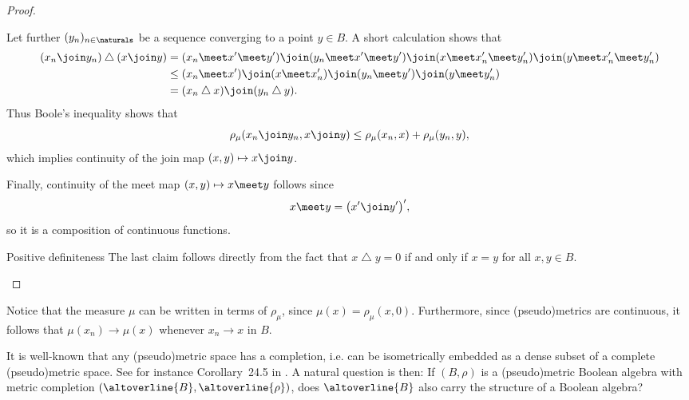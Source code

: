 \documentclass[article, a4paper, 11pt, oneside]{memoir}
\numberwithin{equation}{chapter}
\renewcommand{\symdiff}{\mathbin{\triangle}}
\begin{document}
\begin{proof}
\begin{proofsec}
    Let further $(y_n)_{n\in\naturals}$ be a sequence converging to a point $y \in B$. A short calculation shows that
    \begin{align*}
        (x_n \join y_n) \symdiff (x \join y)
            &= (x_n \meet x' \meet y') \join
               (y_n \meet x' \meet y') \join
               (x \meet x_n' \meet y_n') \join
               (y \meet x_n' \meet y_n') \\
            &\leq (x_n \meet x') \join
            (x \meet x_n') \join
            (y_n \meet y') \join
            (y \meet y_n') \\
            &= (x_n \symdiff x) \join (y_n \symdiff y).
    \end{align*}
    Thus Boole's inequality shows that
    \begin{equation}
        \label{eq:join-continuous}
        \rho_\mu(x_n \join y_n, x \join y)
            \leq \rho_\mu(x_n,x) + \rho_\mu(y_n,y),
    \end{equation}
    which implies continuity of the join map $(x,y) \mapsto x \join y$.

    Finally, continuity of the meet map $(x,y) \mapsto x \meet y$ follows since
    \begin{equation*}
        x \meet y
            = \bigl( x' \join y' \bigr)',
    \end{equation*}
    so it is a composition of continuous functions.

    \item[Positive definiteness]
    The last claim follows directly from the fact that $x \symdiff y = 0$ if and only if $x = y$ for all $x,y \in B$.
\end{proofsec}
\end{proof}

\begin{remark}
    \label{rem:convergence-of-measure}
    Notice that the measure $\mu$ can be written in terms of $\rho_\mu$, since $\mu(x) = \rho_\mu(x,0)$. Furthermore, since (pseudo)metrics are continuous, it follows that $\mu(x_n) \to \mu(x)$ whenever $x_n \to x$ in $B$.
\end{remark}


It is well-known that any (pseudo)metric space has a completion, i.e. can be isometrically embedded as a dense subset of a complete (pseudo)metric space. See for instance Corollary~24.5 in \textcite{willard}. A natural question is then: If $(B,\rho)$ is a (pseudo)metric Boolean algebra with metric completion $(\altoverline{B}, \altoverline{\rho})$, does $\altoverline{B}$ also carry the structure of a Boolean algebra?
\end{document}
